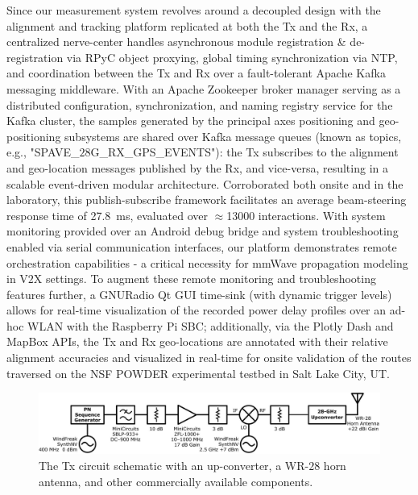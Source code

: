 \documentclass[12pt, draftcls, onecolumn]{IEEEtran}
\begin{document}
Since our measurement system revolves around a decoupled design with the alignment and tracking platform replicated at both the Tx and the Rx, a centralized nerve-center handles asynchronous module registration \& de-registration via RPyC object proxying, global timing synchronization via NTP, and coordination between the Tx and Rx over a fault-tolerant Apache Kafka messaging middleware. With an Apache Zookeeper broker manager serving as a distributed configuration, synchronization, and naming registry service for the Kafka cluster, the samples generated by the principal axes positioning and geo-positioning subsystems are shared over Kafka message queues (known as topics, e.g., "SPAVE\_$28$G\_RX\_GPS\_EVENTS"): the Tx subscribes to the alignment and geo-location messages published by the Rx, and vice-versa, resulting in a scalable event-driven modular architecture. Corroborated both onsite and in the laboratory, this publish-subscribe framework facilitates an average beam-steering response time of \SI{27.8}{\milli\second}, evaluated over ${\approx}$\SI{13000}{} interactions. With system monitoring provided over an Android debug bridge and system troubleshooting enabled via serial communication interfaces, our platform demonstrates remote orchestration capabilities - a critical necessity for mmWave propagation modeling in V$2$X settings. To augment these remote monitoring and troubleshooting features further, a GNURadio Qt GUI time-sink (with dynamic trigger levels) allows for real-time visualization of the recorded power delay profiles over an ad-hoc WLAN with the Raspberry Pi SBC; additionally, via the Plotly Dash and MapBox APIs, the Tx and Rx geo-locations are annotated with their relative alignment accuracies and visualized in real-time for onsite validation of the routes traversed on the NSF POWDER experimental testbed in Salt Lake City, UT.
\begin{figure} [t]
    \centering
    \includegraphics[width=1.0\linewidth]{figs/tx_schematic.pdf}
    \vspace{-6mm}
    \caption{The Tx circuit schematic with an up-converter, a WR-$28$ horn antenna, and other commercially available components.}
    \label{F2a}
    \vspace{-6mm}
\end{figure}
\end{document}
